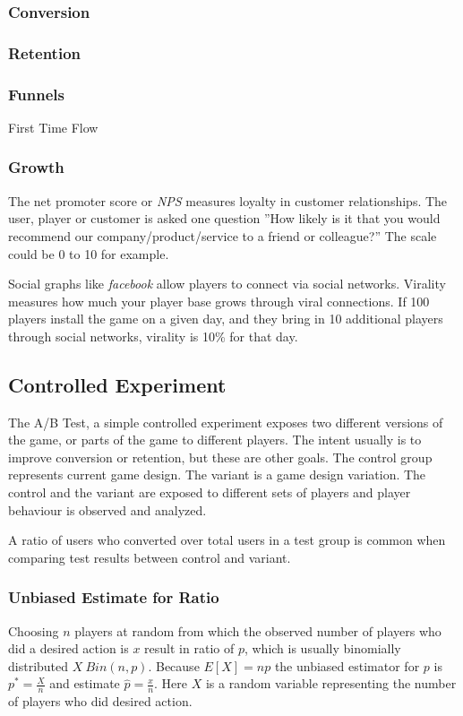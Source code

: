\documentclass[english,12pt,a4paper,pdftex,elec,utf8]{aaltothesis}
\begin{document}
\subsubsection{Conversion}

\subsubsection{Retention}
\subsubsection{Funnels}
First Time Flow
\subsubsection{Growth}
The net promoter score or \textit{NPS} measures loyalty in customer relationships. The user, player or customer is asked one question ''How likely is it that you would recommend our company/product/service to a friend or colleague?'' The scale could be 0 to 10 for example. \cite{Reichheld2003}

Social graphs like \textit{facebook} allow players to connect via social networks. Virality measures how much your player base grows through viral connections. If 100 players install the game on a given day, and they bring in 10 additional players through social networks, virality is 10\% for that day.\cite{Oracle2012}

\subsection{Controlled Experiment}
The A/B Test, a simple controlled experiment exposes two different versions of the game, or parts of the game to different players. The intent usually is to improve conversion or retention, but these are other goals. The control group represents current game design. The variant is a game design variation. The control and the variant are exposed to different sets of players and player behaviour is observed and analyzed.\cite{}

A ratio of users who converted over total users in a test group is common when comparing test results between control and variant.

\subsubsection{Unbiased Estimate for Ratio}
Choosing $n$ players at random from which the observed number of players who did a desired action is $x$ result in ratio of $p$, which is usually binomially distributed $X ~ Bin(n,p)$. Because $E[X] = np$ the unbiased estimator for $p$ is $p^*=\frac{X}{n}$ and estimate $\hat{p}=\frac{x}{n}$. Here $X$ is a random variable representing the number of players who did desired action.\cite[p.162]{Laininen1998}
\end{document}
